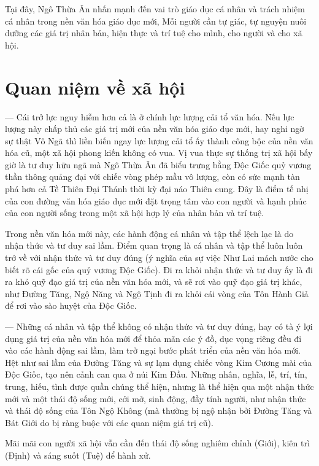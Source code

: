 Tại đây, Ngô Thừa Ân nhấn mạnh đến vai trò giáo dục cá nhân và trách nhiệm cá nhân trong nền văn hóa giáo dục mới, Mỗi người cần tự giác, tự nguyện nuôi dưỡng các giá trị nhân bản, hiện thực và trí tuệ cho mình, cho người và cho xã hội.

\section{Quan niệm về xã hội} %
\label{sec:50_51_xa_hoi}

— Cái trở lực nguy hiễm hơn cả là ở chính lực lượng cải tổ văn hóa. Nếu lực lượng này chấp thủ các giá trị mới của nền văn hóa giáo dục mới, hay nghi ngờ sự thật Vô Ngã thì liền biến ngay lực lượng cải tổ ấy thành công bộc của nền văn hóa cũ, một xã hội phong kiến không có vua. Vị vua thực sự thống trị xã hội bấy giờ là tư duy hữu ngã mà Ngô Thừa Ân đã biểu trưng bằng Độc Giốc quỷ vương thần thông quảng đại với chiếc vòng phép mầu vô lượng, còn có sức mạnh tàn phá hơn cả Tề Thiên Đại Thánh thời kỳ đại náo Thiên cung. Đây là điểm tế nhị của con đường văn hóa giáo dục mới đặt trọng tâm vào con người và hạnh phúc của con người sống trong một xã hội hợp lý của nhân bản và trí tuệ.

Trong nền văn hóa mới này, các hành động cá nhân và tập thể lệch lạc là do nhận thức và tư duy sai lầm. Điểm quan trọng là cá nhân và tập thể luôn luôn trở về với nhận thức và tư duy đúng (ý nghĩa của sự việc Như Lai mách nước cho biết rõ cái gốc của quỷ vương Độc Giốc). Đi ra khỏi nhận thức và tư duy ấy là đi ra khỏ quỹ đạo giá trị của nền văn hóa mới, và sẽ rơi vào quỹ đạo giá trị khác, như Đường Tăng, Ngộ Năng và Ngộ Tịnh đi ra khỏi cái vòng của Tôn Hành Giả để rơi vào sào huyệt của Độc Giốc.

— Những cá nhân và tập thể không có nhận thức và tư duy đúng, hay có tà ý lợi dụng giá trị của nền văn hóa mới để thỏa mãn các ý đồ, dục vọng riêng đều đi vào các hành động sai lầm, làm trở ngại bước phát triển của nền văn hóa mới. Hệt như sai lầm của Đường Tăng và sự lạm dụng chiếc vòng Kim Cương mài của Độc Giốc, tạo nên cảnh can qua ở núi Kim Đầu. Những nhân, nghĩa, lễ, trí, tín, trung, hiếu, tình được quần chúng thể hiện, nhưng là thể hiện qua một nhận thức mới và một thái độ sống mới, cởi mở, sinh động, đầy tính người, như nhận thức và thái độ sống của Tôn Ngộ Không (mà thường bị ngộ nhận bởi Đường Tăng và Bát Giới do bị ràng buộc với các quan niệm giá trị cũ).

Mãi mãi con người xã hội vẫn cần đến thái độ sống nghiêm chỉnh (Giới), kiên trì (Định) và sáng suốt (Tuệ) để hành xử.
